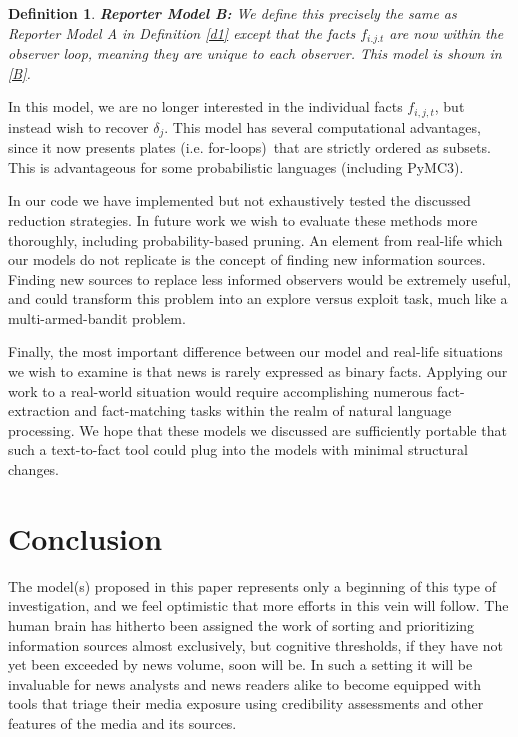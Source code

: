 \documentclass{amsart}
\theoremstyle{plain}
\newtheorem{definition}{Definition}
\numberwithin{equation}{section}
\begin{document}
\begin{definition}
\textbf{Reporter Model B:} We define this precisely the same as Reporter
Model A in Definition \ref{d1} except that the facts $f_{i.j.t}$ are now
within the observer loop, meaning they are unique to each observer. This
model is shown in \autoref{B}.
\end{definition}


In this model, we are no longer interested in the individual facts $f_{i,j,t}
$, but instead wish to recover $\delta _{j}$. This model has several
computational advantages, since it now presents plates (i.e. for-loops)\
that are strictly ordered as subsets. This is advantageous for some
probabilistic languages (including PyMC3).

In our code we have implemented but not exhaustively tested the discussed
reduction strategies. In future work we wish to evaluate these methods more
thoroughly, including probability-based pruning. An element from real-life
which our models do not replicate is the concept of finding new information
sources. Finding new sources to replace less informed observers would be
extremely useful, and could transform this problem into an explore versus
exploit task, much like a multi-armed-bandit problem. 

Finally, the most important difference between our model and real-life
situations we wish to examine is that news is rarely expressed as binary
facts. Applying our work to a real-world situation would require
accomplishing numerous fact-extraction and fact-matching tasks within the
realm of natural language processing. We hope that these models we discussed
are sufficiently portable that such a text-to-fact tool could plug into the
models with minimal structural changes.

\section{Conclusion}

The model(s) proposed in this paper represents only a beginning of this type
of investigation, and we feel optimistic that more efforts in this vein will
follow. The human brain has hitherto been assigned the work of sorting and
prioritizing information sources almost exclusively, but cognitive
thresholds, if they have not yet been exceeded by news volume, soon will be.
In such a setting it will be invaluable for news analysts and news readers
alike to become equipped with tools that triage their media exposure using
credibility assessments and other features of the media and its sources.
\end{document}
